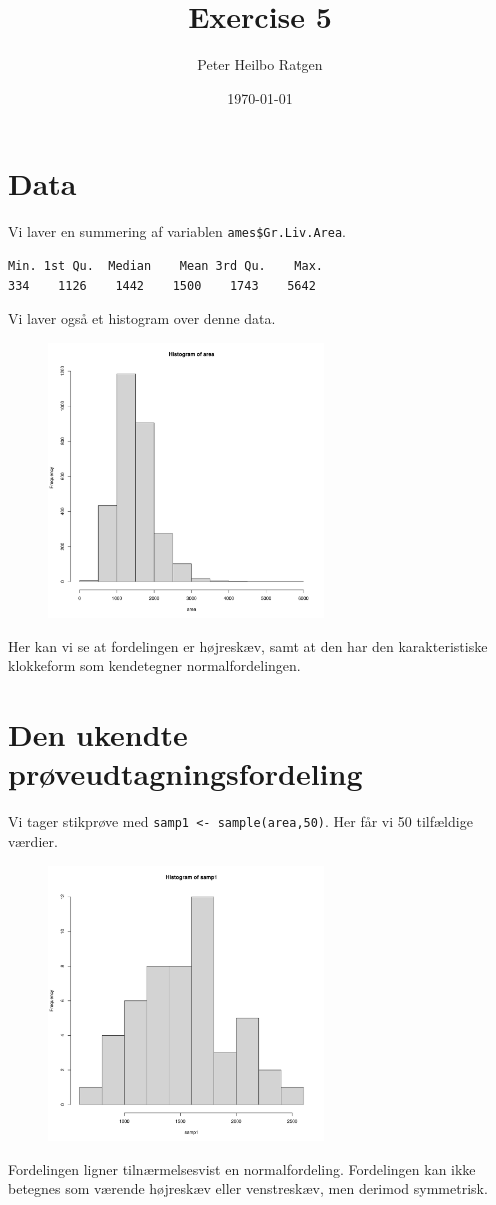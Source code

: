 \documentclass{article}
\title{Exercise 5}
\author{Peter Heilbo Ratgen}
\date{\today}
\begin{document}
\maketitle
\section{Data}
Vi laver en summering af variablen \texttt{ames\$Gr.Liv.Area}. 
\begin{lstlisting}
Min. 1st Qu.  Median    Mean 3rd Qu.    Max.
334    1126    1442    1500    1743    5642
\end{lstlisting}
Vi laver også et histogram over denne data.
\begin{figure}[H]
  \centering
  \includegraphics[width=0.65\textwidth]{../area_hist.pdf}
\end{figure}
Her kan vi se at fordelingen er højreskæv, samt at den har den karakteristiske
klokkeform som kendetegner normalfordelingen. 

\section{Den ukendte prøveudtagningsfordeling}
Vi tager stikprøve med \texttt{samp1 <- sample(area,50)}. Her får vi 50
tilfældige værdier. 
\begin{figure}[H]
  \centering
  \includegraphics[width=0.65\textwidth]{../sample_area_hist.pdf}
\end{figure}
Fordelingen ligner tilnærmelsesvist en normalfordeling. Fordelingen kan ikke
betegnes som værende højreskæv eller venstreskæv, men derimod symmetrisk.
\end{document}
